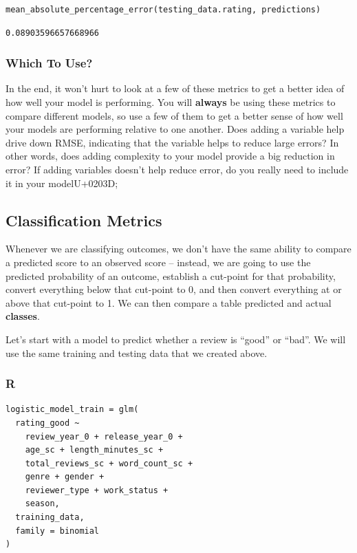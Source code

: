 \documentclass[
  letterpaper,
]{krantz}
\begin{document}
\begin{verbatim}
mean_absolute_percentage_error(testing_data.rating, predictions)
\end{verbatim}

\begin{verbatim}
0.08903596657668966
\end{verbatim}

\subsubsection{Which To Use?}\label{which-to-use}

In the end, it won't hurt to look at a few of these metrics to get a
better idea of how well your model is performing. You will
\textbf{always} be using these metrics to compare different models, so
use a few of them to get a better sense of how well your models are
performing relative to one another. Does adding a variable help drive
down RMSE, indicating that the variable helps to reduce large errors? In
other words, does adding complexity to your model provide a big
reduction in error? If adding variables doesn't help reduce error, do
you really need to include it in your modelU+0203D;

\subsection{Classification Metrics}\label{sec-knowing-class-metrics}

Whenever we are classifying outcomes, we don't have the same ability to
compare a predicted score to an observed score -- instead, we are going
to use the predicted probability of an outcome, establish a cut-point
for that probability, convert everything below that cut-point to 0, and
then convert everything at or above that cut-point to 1. We can then
compare a table predicted and actual \textbf{classes}.

Let's start with a model to predict whether a review is ``good'' or
``bad''. We will use the same training and testing data that we created
above.

\subsubsection{R}

\begin{verbatim}
logistic_model_train = glm(
  rating_good ~ 
    review_year_0 + release_year_0 + 
    age_sc + length_minutes_sc + 
    total_reviews_sc + word_count_sc +
    genre + gender +
    reviewer_type + work_status +
    season, 
  training_data, 
  family = binomial
)
\end{verbatim}
\end{document}
